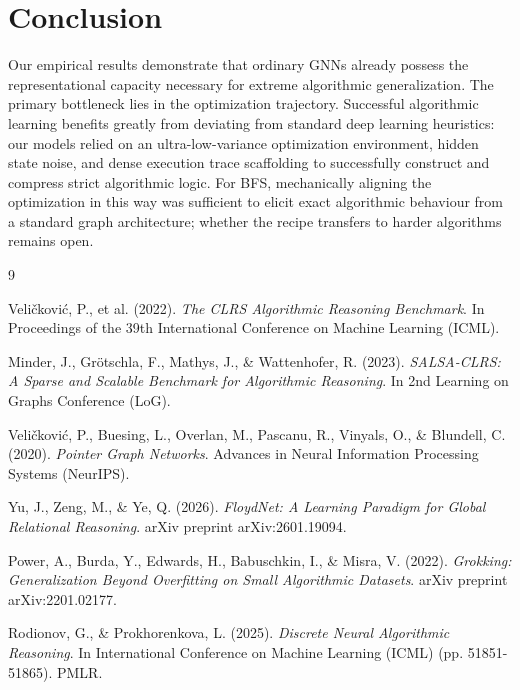 \documentclass{article}
\begin{document}
\section{Conclusion}
Our empirical results demonstrate that ordinary GNNs already possess the representational capacity necessary for extreme algorithmic generalization. The primary bottleneck lies in the optimization trajectory. Successful algorithmic learning benefits greatly from deviating from standard deep learning heuristics: our models relied on an ultra-low-variance optimization environment, hidden state noise, and dense execution trace scaffolding to successfully construct and compress strict algorithmic logic. For BFS, mechanically aligning the optimization in this way was sufficient to elicit exact algorithmic behaviour from a standard graph architecture; whether the recipe transfers to harder algorithms remains open.

\clearpage
\begin{thebibliography}{9}

Veli\v{c}kovi\'{c}, P., et al. (2022). 
\textit{The CLRS Algorithmic Reasoning Benchmark}. 
In Proceedings of the 39th International Conference on Machine Learning (ICML).

Minder, J., Gr\"{o}tschla, F., Mathys, J., \& Wattenhofer, R. (2023). 
\textit{SALSA-CLRS: A Sparse and Scalable Benchmark for Algorithmic Reasoning}. 
In 2nd Learning on Graphs Conference (LoG).

Veli\v{c}kovi\'{c}, P., Buesing, L., Overlan, M., Pascanu, R., Vinyals, O., \& Blundell, C. (2020). 
\textit{Pointer Graph Networks}. 
Advances in Neural Information Processing Systems (NeurIPS).

Yu, J., Zeng, M., \& Ye, Q. (2026). 
\textit{FloydNet: A Learning Paradigm for Global Relational Reasoning}. 
arXiv preprint arXiv:2601.19094.

Power, A., Burda, Y., Edwards, H., Babuschkin, I., \& Misra, V. (2022). 
\textit{Grokking: Generalization Beyond Overfitting on Small Algorithmic Datasets}. 
arXiv preprint arXiv:2201.02177.

Rodionov, G., \& Prokhorenkova, L. (2025). 
\textit{Discrete Neural Algorithmic Reasoning}. 
In International Conference on Machine Learning (ICML) (pp. 51851-51865). PMLR.

\end{thebibliography}
\end{document}
